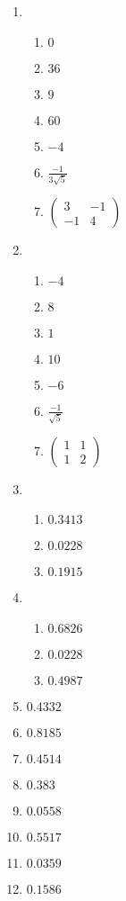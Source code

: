 \documentclass[12pt]{article}
\begin{document}
\begin{enumerate}
\item
\begin{enumerate}
\item   $0 $
\item   $36$
\item  $9 $
\item   $60 $
\item  $-4$
\item   $\frac{-1}{3\sqrt{5}}$
\item  $\begin{pmatrix}
 3 & -1 \\
-1 & 4
\end{pmatrix}$
\end{enumerate}

\item
\begin{enumerate}
\item $-4$
\item $8 $
\item $1 $
\item $10 $
\item $-6$
\item$ \frac{-1}{\sqrt{5}}$

\item $\begin{pmatrix}
 1 & 1 \\
 1 & 2
\end{pmatrix}$
\end{enumerate}
\item
\begin{enumerate}
\item $0.3413$
\item $0.0228$
\item $0.1915$
\end{enumerate}

\item
\begin{enumerate}
\item $0.6826$
\item $0.0228  $
\item $0.4987  $
\end{enumerate}

\item $0.4332 $
\item $0.8185  $
\item $0.4514 $
\item $0.383  $
\item $0.0558 $
\item $0.5517$
\item $0.0359 $
\item $0.1586$


\end{enumerate}
\end{document}
